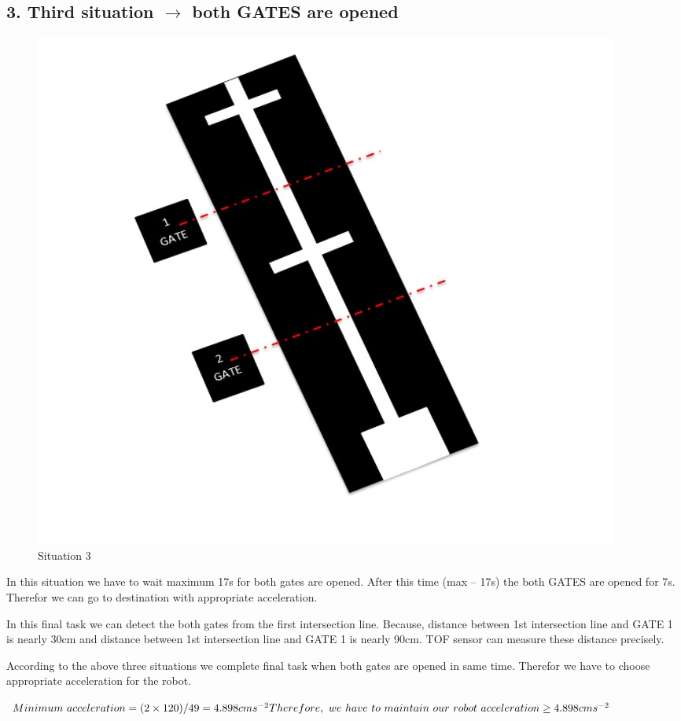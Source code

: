 \documentclass[a4paper, 12pt]{article}
\begin{document}
    \subsection*{3.	Third situation $\rightarrow$ both GATES are opened}
        \begin{figure}[h]
            \centering
            \includegraphics{images/sit3.jpg}
            \caption{Situation 3}
            \label{fig:my_label}
        \end{figure}
        In this situation we have to wait maximum 17s for both gates are opened. After this time (max – 17s) the both GATES are opened for 7s. Therefor we can go to destination with appropriate acceleration.
        \par
        In this final task we can detect the both gates from the first intersection line. Because, distance between 1st intersection line and GATE 1 is nearly 30cm and distance between 1st intersection line and GATE 1 is nearly 90cm. TOF sensor can measure these distance precisely. 
        \par
        According to the above three situations we complete final task when both gates are opened in same time. Therefor we have to choose appropriate acceleration for the robot.
        
        $Minimum \ acceleration = (2 \times 120)/49
                                            = 4.898cms^{-2}  \\          
Therefore, \ we \ have \ to \ maintain \  our\  robot\  acceleration \geq 4.898cms^{-2}$



    

\printbibliography
\end{document}
